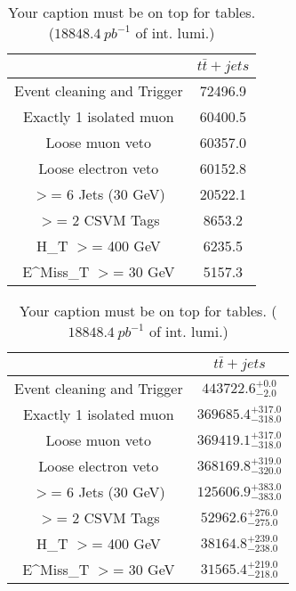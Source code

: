 \documentclass{article}
\begin{document}
\begin{table}
\caption{Your caption must be on top for tables. ($18848.4~pb^{-1}$ of int. lumi.)}
\label{tab:}
\centering
\begin{tabular}{|c|c|}
\toprule
&$t\bar{t}+jets$	\\

\midrule
Event cleaning and Trigger&	72496.9	\\

Exactly 1 isolated muon&	60400.5	\\

Loose muon veto&	60357.0	\\

Loose electron veto&	60152.8	\\

$>$= 6 Jets (30 GeV)&	20522.1	\\

$>$= 2 CSVM Tags&	8653.2	\\

H_{T} $>$=  400 GeV&	6235.5	\\

E^{Miss}_{T} $>$=  30 GeV&	5157.3	\\

\bottomrule
\end{tabular}
\end{table}
\begin{table}
\caption{Your caption must be on top for tables. ($18848.4~pb^{-1}$ of int. lumi.)}
\label{tab:}
\centering
\begin{tabular}{|c|c|}
\toprule
&$t\bar{t}+jets$	\\

\midrule
Event cleaning and Trigger&	$443722.6^{+0.0}_{-2.0}$	\\

Exactly 1 isolated muon&	$369685.4^{+317.0}_{-318.0}$	\\

Loose muon veto&	$369419.1^{+317.0}_{-318.0}$	\\

Loose electron veto&	$368169.8^{+319.0}_{-320.0}$	\\

$>$= 6 Jets (30 GeV)&	$125606.9^{+383.0}_{-383.0}$	\\

$>$= 2 CSVM Tags&	$52962.6^{+276.0}_{-275.0}$	\\

H_{T} $>$=  400 GeV&	$38164.8^{+239.0}_{-238.0}$	\\

E^{Miss}_{T} $>$=  30 GeV&	$31565.4^{+219.0}_{-218.0}$	\\

\bottomrule
\end{tabular}
\end{table}
\end{document}
